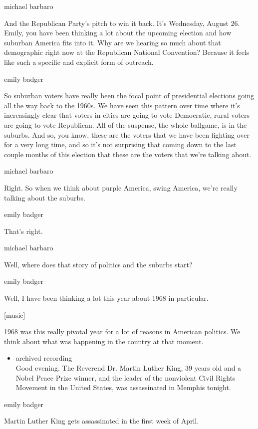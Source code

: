 michael barbaro

And the Republican Party's pitch to win it back. It's Wednesday, August
26. Emily, you have been thinking a lot about the upcoming election and
how suburban America fits into it. Why are we hearing so much about that
demographic right now at the Republican National Convention? Because it
feels like such a specific and explicit form of outreach.

emily badger

So suburban voters have really been the focal point of presidential
elections going all the way back to the 1960s. We have seen this pattern
over time where it's increasingly clear that voters in cities are going
to vote Democratic, rural voters are going to vote Republican. All of
the suspense, the whole ballgame, is in the suburbs. And so, you know,
these are the voters that we have been fighting over for a very long
time, and so it's not surprising that coming down to the last couple
months of this election that these are the voters that we're talking
about.

michael barbaro

Right. So when we think about purple America, swing America, we're
really talking about the suburbs.

emily badger

That's right.

michael barbaro

Well, where does that story of politics and the suburbs start?

emily badger

Well, I have been thinking a lot this year about 1968 in particular.

{[}music{]}

1968 was this really pivotal year for a lot of reasons in American
politics. We think about what was happening in the country at that
moment.

\begin{itemize}
\tightlist
\item
  archived recording\\
  Good evening. The Reverend Dr. Martin Luther King, 39 years old and a
  Nobel Peace Prize winner, and the leader of the nonviolent Civil
  Rights Movement in the United States, was assassinated in Memphis
  tonight.
\end{itemize}

emily badger

Martin Luther King gets assassinated in the first week of April.

